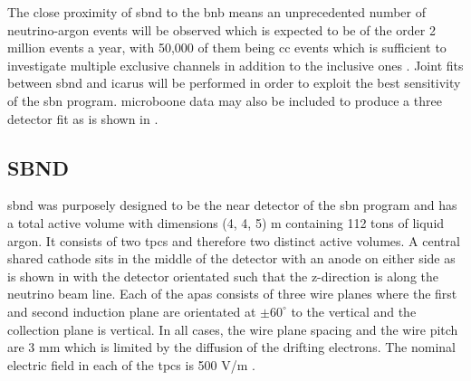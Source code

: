 The close proximity of \gls{sbnd} to the \gls{bnb} means an unprecedented number of neutrino-argon events will be observed which is expected to be of the order 2 million events a year, with 50,000 of them being \nue \gls{cc} events which is sufficient to investigate multiple exclusive channels in addition to the inclusive ones \cite{sbnd_pot}. Joint fits between \gls{sbnd} and \gls{icarus} will be performed in order to exploit the best sensitivity of the \gls{sbn} program. \gls{microboone} data may also be included to produce a three detector fit as is shown in . 

\subsection{SBND}\label{sec:SBND}

\gls{sbnd} was purposely designed to be the near detector of the \gls{sbn} program and has a total active volume with dimensions (4, 4, 5) m containing 112 tons of liquid argon. It consists of two \glspl{tpc} and therefore two distinct active volumes. A central shared cathode sits in the middle of the detector with an anode on either side as is shown in  with the detector orientated such that the z-direction is along the neutrino beam line. Each of the \glspl{apa} consists of three wire planes where the first and second induction plane are orientated at $\pm 60^{\circ}$ to the vertical and the collection plane is vertical. In all cases, the wire plane spacing and the wire pitch are 3 mm which is limited by the diffusion of the drifting electrons. The nominal electric field in each of the \glspl{tpc} is 500 V/m \cite{SBN_Proposal}. 

